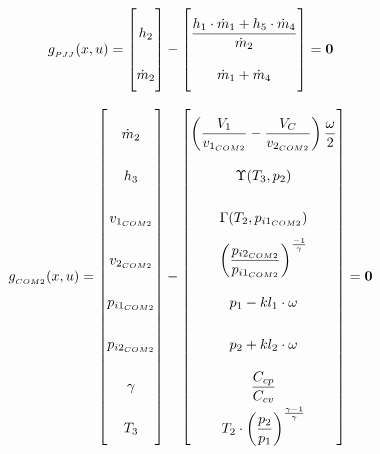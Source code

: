 \begin{equation} \label{eq:Gpjj}\renewcommand{\arraystretch}{2.5}
	g_{_{PJJ}}(x,u) =  \begin{bmatrix}
		h_{2}				\\ %
		\dot{m}_{2}			\\ %
	\end{bmatrix}
	-
	\begin{bmatrix}
		\dfrac{h_{1} \cdot \dot{m}_{1} + h_{5} \cdot \dot{m}_{4}}{ \dot{m}_{2} } \\ 	%
		\dot{m}_{1} + \dot{m}_{4} \\													%
	\end{bmatrix}
	=\textbf{0}
\end{equation}


\begin{equation} \label{eq:Gcs2}\renewcommand{\arraystretch}{2.5}
	g_{_{COM2}}(x,u) =  \begin{bmatrix}
		\dot{m}_2  		 	\\ %
		h_{3}				\\ %
		v_{1_{COM2}}			\\ %
		v_{2_{COM2}}			\\ %
		p_{i1_{COM2}}		\\ %
		p_{i2_{COM2}}		\\ %
		\gamma				\\ %
		T_{3}				\\ %
	\end{bmatrix}
	-
	\begin{bmatrix}
		\left(\dfrac{V_1}{v_{1_{COM2}}} - \dfrac{V_C}{v_{2_{COM2}}}\right) \dfrac{\omega}{2} \\			%
		\Upsilon(T_{3}, p_{2})		\\													%
		\Gamma(T_{2},p_{i1_{COM2}}) \\													%
		\left(\dfrac{p_{i2_{COM2}}}{p_{i1_{COM2}}}\right)^{\frac{-1}{\gamma}} \\		%
		p_{1} - kl_1 \cdot \omega \\													%
		p_{2} + kl_2 \cdot \omega \\													%
		\dfrac{C_{cp}}{C_{cv}} \\														%
		T_{2}\cdot \left(\dfrac{p_{2}}{p_{1}}\right)^{\frac{\gamma-1}{\gamma}}	\\		%
	\end{bmatrix}
	=\textbf{0}
\end{equation}


